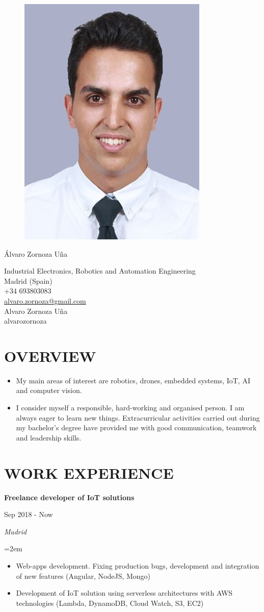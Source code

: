 \documentclass[10pt,a4paper,oneside]{book}
\newcommand{\sepspace}{\vspace*{0pt}}		%
\newcommand{\MyName}[1]{ %
		\Huge \usefont{OT1}{phv}{b}{n} \hfill #1
		\par \normalsize \normalfont}
\newcommand{\MySlogan}[1]{ %
		\large 
		\hfill #1
		\par \normalsize \normalfont}
\newcommand{\NewPart}[2]{\section*{\uppercase{#1} #2}}
\newcommand{\EducationEntrya}[4]{\noindent\ignorespaces	
		\begin{minipage}[t][][b]{0.8\textwidth} \raggedright{\textbf{#1}} \end{minipage} \hfill 
		\begin{minipage}[t][][b]{0.2\textwidth} \hfill\color{Black}#2\end{minipage} 
		 
		\noindent \textit{#3} \par        %
		\noindent\hangindent=2em\hangafter=0 \small #4 
		\normalsize \par}
\begin{document}

\begin{figure}
	\vspace*{-2em}
		\includegraphics[width=.19\textwidth]{Assets/picture.JPG}
\end{figure}

\MyName{Álvaro Zornoza Uña}
\MySlogan{\vspace{-0.15in}\begin{flushright} 
\hfill Industrial Electronics, Robotics and Automation Engineering \\ Madrid (Spain) \\ +34 693803083 \\ 
\href{mailto:alvaro.zornoza@gmail.com}{alvaro.zornoza@gmail.com} \\ \href{https://www.linkedin.com/in/alvaro-zornoza/}{ \faLinkedin} Alvaro Zornoza Uña \\ \href{https://github.com/alvarozornoza}{ \faGithub} alvarozornoza \\ 
\end{flushright}}

\vspace{0.01in}
\sepspace
 \NewPart{Overview}{}
 
 \begin{itemize}
 \item My main areas of interest are robotics, drones, embedded systems, IoT, AI and computer vision.
 \item I consider myself a responsible, hard-working and organised person. I am always eager to learn new things. Extracurricular activities carried out during my bachelor's degree have provided me with good communication, teamwork and leadership skills.
 \end{itemize}

\NewPart{Work Experience}{}

\EducationEntrya{Freelance developer of IoT solutions}{Sep 2018 - Now}{Madrid}{\begin{itemize}
\item Web-apps development. Fixing production bugs, development and integration of new features (Angular, NodeJS, Mongo)
\item Development of IoT solution using serverless architectures with AWS technologies (Lambda, DynamoDB, Cloud Watch, S3, EC2)
\end{itemize}}
\sepspace
\end{document}
